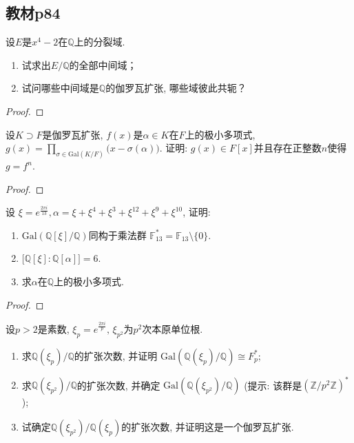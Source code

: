 \subsection{教材p84}

\begin{problem}
    设$E$是$x^4-2$在$\mathbb{Q}$上的分裂域.
\begin{enumerate}[(1)]
    \item 试求出$E/\mathbb{Q}$的全部中间域；
    \item 试问哪些中间域是$\mathbb{Q}$的伽罗瓦扩张, 哪些域彼此共轭？
\end{enumerate}
\end{problem}

\begin{proof}
    
\end{proof}

\begin{problem}
    设$K \supset F$是伽罗瓦扩张, $f(x)$是$\alpha \in K$在$F$上的极小多项式, 
\(
    g(x) = \prod_{\sigma \in \mathrm{Gal}(K/F)} \big(x - \sigma(\alpha) \big).
\)
证明: $g(x) \in F[x]$并且存在正整数$n$使得$g = f^n$.
\end{problem}

\begin{proof}
    
\end{proof}

\begin{problem}
    设
$\xi = e^{\frac{2\pi i}{13}}, \alpha = \xi + \xi^4 + \xi^3 + \xi^{12} + \xi^9 + \xi^{10}$,
证明: 
\begin{enumerate}[(1)]
    \item $\mathrm{Gal}\left(\mathbb{Q}[\xi]/\mathbb{Q}\right)$同构于乘法群
$\mathbb{F}_{13}^* = \mathbb{F}_{13} \setminus \{0\}$.
    \item $\bigl[\mathbb{Q}[\xi]:\mathbb{Q}[\alpha]\bigr] = 6$.
    \item 求$\alpha$在$\mathbb{Q}$上的极小多项式.
\end{enumerate}
\end{problem}

\begin{proof}
    
\end{proof}

\begin{problem}
    设$p > 2$是素数, $\xi_p = e^{\frac{2\pi i}p},\, \xi_{p^2}$为$p^2$次本原单位根. 
\begin{enumerate}[(1)]
    \item 求$\mathbb{Q}(\xi_p)/\mathbb{Q}$的扩张次数, 并证明
$\mathrm{Gal}(\mathbb{Q}(\xi_p)/\mathbb{Q}) \cong F_p^*$;
    \item 求$\mathbb{Q}(\xi_{p^2})/\mathbb{Q}$的扩张次数, 并确定
$\mathrm{Gal}(\mathbb{Q}(\xi_{p^2})/\mathbb{Q})$
(提示: 该群是$(\mathbb{Z}/p^2\mathbb{Z})^*$);
    \item 试确定$\mathbb{Q}(\xi_{p^2})/\mathbb{Q}(\xi_p)$的扩张次数, 并证明这是一个伽罗瓦扩张.
\end{enumerate}
\end{problem}

